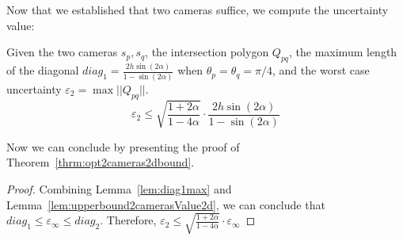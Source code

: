 


Now that we established that two cameras suffice, we compute the uncertainty value:
\begin{lemma}\label{lem:upperbound2camerasValue2d}
Given the two cameras $s_p,s_q$, the intersection polygon $Q_{pq}$, the maximum length of the diagonal $diag_1 =\frac{2h\sin(2\alpha)}{1-\sin(2\alpha)}$ when $\theta_p=\theta_q = \pi/4$, and the worst case uncertainty $\varepsilon_2 = \max||Q_{pq}||$.
\begin{equation}\label{eq:upperbound2camerasValue2d}
\varepsilon_2 \leq \sqrt{\frac{1+2\alpha}{1-4\alpha}} \cdot \frac{2h\sin(2\alpha)}{1-\sin(2\alpha)}
\end{equation}
\end{lemma}




Now we can conclude by presenting the proof of Theorem~\ref{thrm:opt2cameras2dbound}.

\begin{proof}
Combining Lemma~\ref{lem:diag1max} and Lemma~\ref{lem:upperbound2camerasValue2d}, we can conclude that $diag_1 \leq \varepsilon_\infty \leq diag_2$. Therefore, $\varepsilon_2 \leq \sqrt{\frac{1+2\alpha}{1-4\alpha}} \cdot \varepsilon_\infty$ 
\end{proof}

